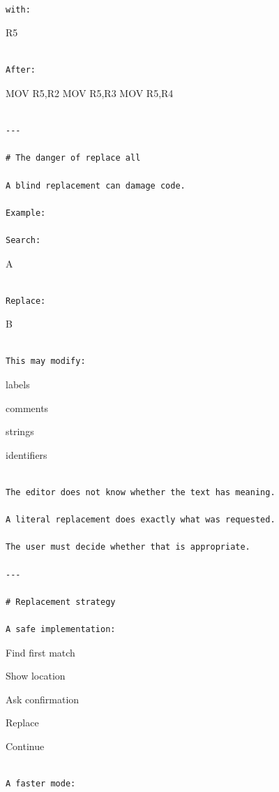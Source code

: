 \documentclass[
  oneside,
  openany]{book}
\begin{document}
\begin{verbatim}

with:
\end{verbatim}

R5

\begin{verbatim}

After:
\end{verbatim}

MOV R5,R2 MOV R5,R3 MOV R5,R4

\begin{verbatim}

---

# The danger of replace all

A blind replacement can damage code.

Example:

Search:
\end{verbatim}

A

\begin{verbatim}

Replace:
\end{verbatim}

B

\begin{verbatim}

This may modify:
\end{verbatim}

labels

comments

strings

identifiers

\begin{verbatim}

The editor does not know whether the text has meaning.

A literal replacement does exactly what was requested.

The user must decide whether that is appropriate.

---

# Replacement strategy

A safe implementation:
\end{verbatim}

Find first match

Show location

Ask confirmation

Replace

Continue

\begin{verbatim}

A faster mode:
\end{verbatim}
\end{document}
